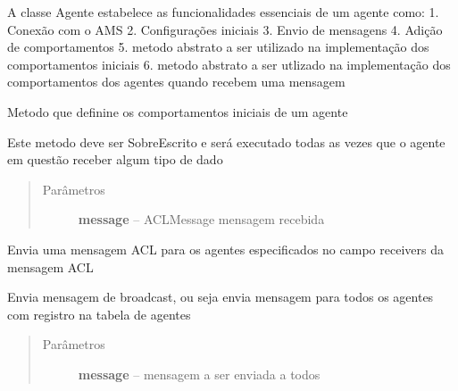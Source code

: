 \documentclass[letterpaper,10pt,brazil]{sphinxmanual}
\begin{document}
\begin{fulllineitems}
\label{api:pade.core.agent.Agent}
A classe Agente estabelece as funcionalidades essenciais de um agente como:
1. Conexão com o AMS
2. Configurações iniciais
3. Envio de mensagens
4. Adição de comportamentos
5. metodo abstrato a ser utilizado na implementação dos comportamentos iniciais 
6. metodo abstrato a ser utlizado na implementação dos comportamentos dos agentes quando recebem uma mensagem

\begin{fulllineitems}
\label{api:pade.core.agent.Agent.on_start}
Metodo que definine os comportamentos
iniciais de um agente

\end{fulllineitems}


\begin{fulllineitems}
\label{api:pade.core.agent.Agent.react}
Este metodo deve ser SobreEscrito e será
executado todas as vezes que o agente em
questão receber algum tipo de dado
\begin{quote}\begin{description}
\item[{Parâmetros}] \leavevmode
\textbf{message} -- ACLMessage
mensagem recebida

\end{description}\end{quote}

\end{fulllineitems}


\begin{fulllineitems}
\label{api:pade.core.agent.Agent.send}
Envia uma mensagem ACL para os agentes
especificados no campo receivers da mensagem ACL

\end{fulllineitems}


\begin{fulllineitems}
\label{api:pade.core.agent.Agent.send_to_all}
Envia mensagem de broadcast, ou seja envia mensagem
para todos os agentes com registro na tabela de agentes
\begin{quote}\begin{description}
\item[{Parâmetros}] \leavevmode
\textbf{message} -- mensagem a ser enviada a todos


\end{description}
\end{quote}
\end{fulllineitems}
\end{fulllineitems}
\end{document}
